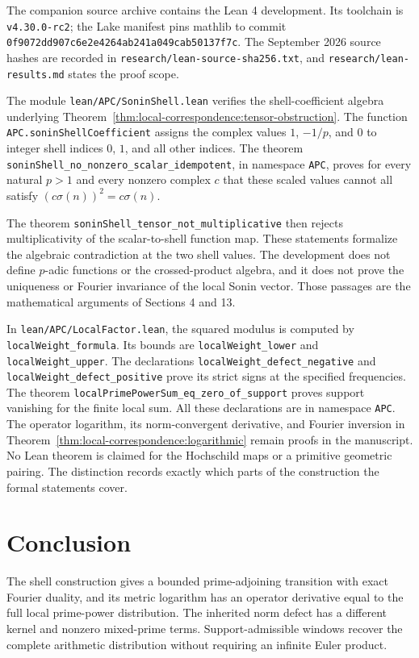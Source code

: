 \documentclass[11pt,letterpaper]{article}
\theoremstyle{definition}
\theoremstyle{remark}
\begin{document}
The companion source archive \cite{APCcode} contains the Lean 4
development. Its toolchain is \texttt{v4.30.0-rc2}; the Lake
manifest pins mathlib to commit
\nolinkurl{0f9072dd907c6e2e4264ab241a049cab50137f7c}.
The September 2026 source hashes are recorded in
\nolinkurl{research/lean-source-sha256.txt}, and
\nolinkurl{research/lean-results.md} states the proof scope.

The module \nolinkurl{lean/APC/SoninShell.lean} verifies the
shell-coefficient algebra underlying
Theorem~\ref{thm:local-correspondence:tensor-obstruction}.
The function \nolinkurl{APC.soninShellCoefficient} assigns the
complex values $1$, $-1/p$, and $0$ to integer shell indices
$0$, $1$, and all other indices. The theorem
\nolinkurl{soninShell_no_nonzero_scalar_idempotent}, in namespace
\texttt{APC}, proves for every natural $p>1$ and every
nonzero complex $c$ that these scaled values cannot all
satisfy $(c\sigma(n))^2=c\sigma(n)$.

The theorem \nolinkurl{soninShell_tensor_not_multiplicative}
then rejects multiplicativity of the scalar-to-shell
function map. These statements formalize the algebraic
contradiction at the two shell values. The development
does not define $p$-adic functions or the crossed-product
algebra, and it does not prove the uniqueness or Fourier
invariance of the local Sonin vector. Those passages
are the mathematical arguments of Sections 4 and 13.

In \nolinkurl{lean/APC/LocalFactor.lean}, the squared modulus
is computed by \nolinkurl{localWeight_formula}. Its bounds
are \nolinkurl{localWeight_lower} and \nolinkurl{localWeight_upper}.
The declarations
\nolinkurl{localWeight_defect_negative} and
\nolinkurl{localWeight_defect_positive} prove its strict
signs at the specified frequencies. The theorem
\nolinkurl{localPrimePowerSum_eq_zero_of_support}
proves support vanishing for the finite local sum.
All these declarations are in namespace \texttt{APC}.
The operator logarithm, its norm-convergent derivative,
and Fourier inversion in Theorem~\ref{thm:local-correspondence:logarithmic}
remain proofs in the manuscript. No Lean theorem is
claimed for the Hochschild maps or a primitive geometric
pairing. The distinction records exactly which parts
of the construction the formal statements cover.

\section{Conclusion}

The shell construction gives a bounded prime-adjoining
transition with exact Fourier duality, and its metric logarithm
has an operator derivative equal to the full local prime-power
distribution. The inherited norm defect has a different
kernel and nonzero mixed-prime terms. Support-admissible
windows recover the complete arithmetic distribution without
requiring an infinite Euler product.
\end{document}
